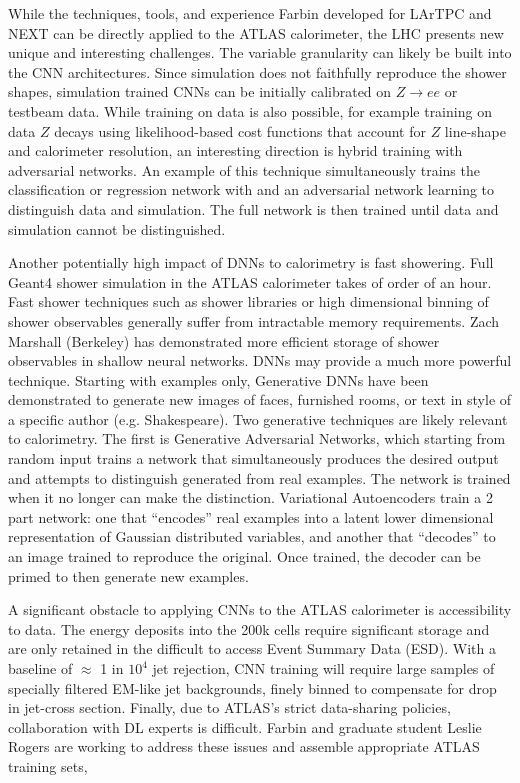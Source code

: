 While the techniques, tools, and experience Farbin developed for
LArTPC and NEXT can be directly applied to the ATLAS calorimeter, the
LHC presents new unique and interesting challenges. The variable
granularity can likely be built into the CNN architectures. Since
simulation does not faithfully reproduce the shower shapes, simulation
trained CNNs can be initially calibrated on $Z\rightarrow e e$ or
testbeam data. While training on data is also possible, for example
training on data $Z$ decays using likelihood-based cost functions that
account for $Z$ line-shape and calorimeter resolution, an interesting
direction is hybrid training with adversarial networks. An example of
this technique simultaneously trains the classification or regression
network with and an adversarial network learning to distinguish data
and simulation. The full network is then trained until data and
simulation cannot be distinguished.

Another potentially high impact of DNNs to calorimetry is fast
showering. Full Geant4 shower simulation in the ATLAS calorimeter
takes of order of an hour. Fast shower techniques such as shower
libraries or high dimensional binning of shower observables generally
suffer from intractable memory requirements. Zach Marshall (Berkeley)
has demonstrated more efficient storage of shower observables in
shallow neural networks. DNNs may provide a much more powerful
technique.  Starting with examples only, Generative DNNs have been
demonstrated to generate new images of faces, furnished rooms, or text
in style of a specific author (e.g. Shakespeare). Two generative
techniques are likely relevant to calorimetry. The first is Generative
Adversarial Networks, which starting from random input trains a
network that simultaneously produces the desired output and attempts
to distinguish generated from real examples. The network is trained
when it no longer can make the distinction. Variational Autoencoders
train a 2 part network: one that ``encodes'' real examples into a
latent lower dimensional representation of Gaussian distributed
variables, and another that ``decodes'' to an image trained to
reproduce the original. Once trained, the decoder can be primed to
then generate new examples.

A significant obstacle to applying CNNs to the ATLAS calorimeter is
accessibility to data. The energy deposits into the 200k cells require
significant storage and are only retained in the difficult to access
Event Summary Data (ESD). With a baseline of $\approx$ 1 in $10^4$ jet
rejection, CNN training will require large samples of specially
filtered EM-like jet backgrounds, finely binned to compensate for
drop in jet-cross section. Finally, due to ATLAS's strict data-sharing
policies, collaboration with DL experts is difficult. Farbin and
graduate student Leslie Rogers are working to address these issues and
assemble appropriate ATLAS training sets,

